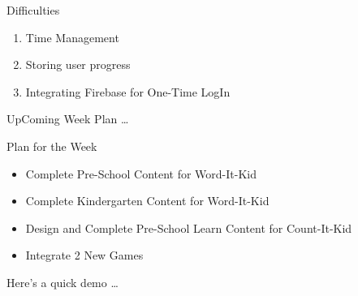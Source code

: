 \documentclass[14pt]{beamer}
\begin{document}
\begin{frame}{Difficulties}
    \begin{enumerate}
	\item Time Management
        \item Storing user progress
	\item Integrating Firebase for One-Time LogIn
    \end{enumerate}
\end{frame}

\begin{frame}[standout]
    \alert{UpComing Week Plan \ldots}
\end{frame}

\begin{frame}{Plan for the Week}
    \begin{itemize}
            \pause
        \item Complete Pre-School Content for Word-It-Kid\\
            \pause
        \item Complete Kindergarten Content for Word-It-Kid\\
            \pause
        \item Design and Complete Pre-School Learn Content for Count-It-Kid\\
            \pause
	\item Integrate 2 New Games
    \end{itemize}
\end{frame}


\begin{frame}[standout]
    Here's a quick demo \ldots
\end{frame}
\end{document}
